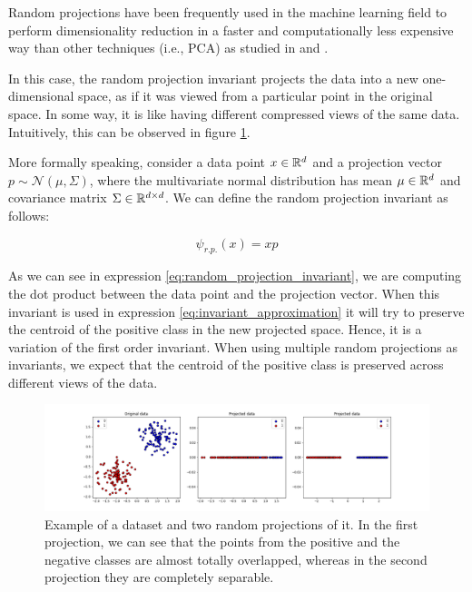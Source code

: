 Random projections have been frequently used in the machine learning field to perform dimensionality reduction
in a faster and computationally less expensive way than other techniques (i.e., PCA) as studied in 
\cite{Dasgupta2000} and \cite{BinghamManila2001}.

In this case, the random projection invariant projects the data into a new one-dimensional space,
as if it was viewed from a particular point in the original space. In some way, it is like having
different compressed views of the same data. Intuitively, this can be observed in figure
\ref{fig:random_projections_example}.

More formally speaking, consider a data point $x \in \mathbb{R}^{d}$ and a projection vector
$p \sim \mathcal{N}(\mu, \Sigma)$, where the multivariate normal distribution has mean $\mu \in \mathbb{R}^{d}$
and covariance matrix $\Sigma \in \mathbb{R}^{d \times d}$. We can define the random projection invariant as follows:

\begin{equation}
    \label{eq:random_projection_invariant}
    \psi_{r.p.}(x) = x p
\end{equation}

As we can see in expression \eqref{eq:random_projection_invariant}, we are computing the dot product between
the data point and the projection vector. When this invariant is used in expression \ref{eq:invariant_approximation}
it will try to preserve the centroid of the positive class in the new projected space. Hence, it is a variation
of the first order invariant. When using multiple random projections as invariants, we expect that the centroid
of the positive class is preserved across different views of the data.

\begin{figure}[h]
    \centering
    \includegraphics[width=\textwidth]{thesis/Figures/random_projections_example}
    \caption{Example of a dataset and two random projections of it. In the first projection, we can see
    that the points from the positive and the negative classes are almost totally overlapped, whereas in the
    second projection they are completely separable.}
    \label{fig:random_projections_example}
\end{figure}

